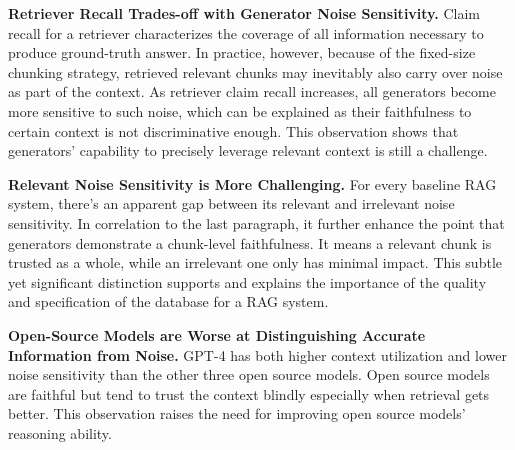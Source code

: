 \textbf{Retriever Recall Trades-off with Generator Noise Sensitivity.} Claim recall for a retriever characterizes the coverage of all information necessary to produce ground-truth answer. In practice, however, because of the fixed-size chunking strategy, retrieved relevant chunks may inevitably also carry over noise as part of the context. As retriever claim recall increases, all generators become more sensitive to such noise, which can be explained as their faithfulness to certain context is not discriminative enough. This observation shows that generators' capability to precisely leverage relevant context is still a challenge.

\textbf{Relevant Noise Sensitivity is More Challenging.} For every baseline RAG system, there's an apparent gap between its relevant and irrelevant noise sensitivity. In correlation to the last paragraph, it further enhance the point that generators demonstrate a chunk-level faithfulness. It means a relevant chunk is trusted as a whole, while an irrelevant one only has minimal impact. This subtle yet significant distinction supports and explains the importance of the quality and specification of the database for a RAG system.

\textbf{Open-Source Models are Worse at Distinguishing Accurate Information from Noise.} GPT-4 has both higher context utilization and lower noise sensitivity than the other three open source models. Open source models are faithful but tend to trust the context blindly especially when retrieval gets better. This observation raises the need for improving open source models' reasoning ability.




